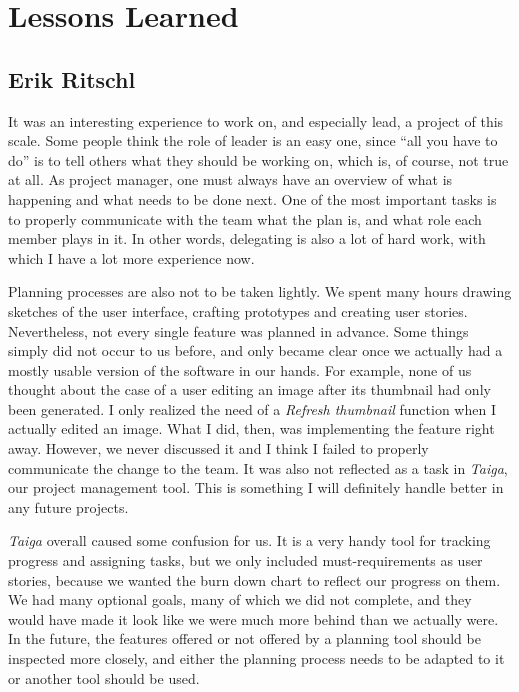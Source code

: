 \section{Lessons Learned}
\def\kapitelautor{}

\subsection{Erik Ritschl}
It was an interesting experience to work on, and especially lead, a project of this scale. Some people think the role of leader is an easy one, since ``all you have to do'' is to tell others what they should be working on, which is, of course, not true at all. As project manager, one must always have an overview of what is happening and what needs to be done next. One of the most important tasks is to properly communicate with the team what the plan is, and what role each member plays in it. In other words, delegating is also a lot of hard work, with which I have a lot more experience now.

Planning processes are also not to be taken lightly. We spent many hours drawing sketches of the user interface, crafting prototypes and creating user stories. 
Nevertheless, not every single feature was planned in advance. Some things simply did not occur to us before, and only became clear once we actually had a mostly usable version of the software in our hands. For example, none of us thought about the case of a user editing an image after its thumbnail had only been generated. I only realized the need of a \emph{Refresh thumbnail} function when I actually edited an image. What I did, then, was implementing the feature right away. However, we never discussed it and I think I failed to properly communicate the change to the team. It was also not reflected as a task in \emph{Taiga}, our project management tool. This is something I will definitely handle better in any future projects.

\emph{Taiga} overall caused some confusion for us. It is a very handy tool for tracking progress and assigning tasks, but we only included must-requirements as user stories, because we wanted the burn down chart to reflect our progress on them. We had many optional goals, many of which we did not complete, and they would have made it look like we were much more behind than we actually were. In the future, the features offered or not offered by a planning tool should be inspected more closely, and either the planning process needs to be adapted to it or another tool should be used.


